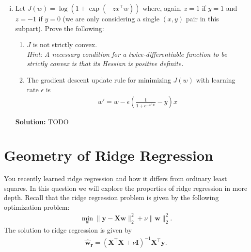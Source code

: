 \documentclass{article}
\newcommand{\mat}[1]{\mathbf{#1}}
\renewcommand{\vec}[1]{\boldsymbol{\mathbf{#1}}}
\newcommand{\Question}[1]{\Large \section{ #1 } \normalsize}
\newenvironment{solution}{\color{blue} \smallskip \textbf{Solution:}}{}
\begin{document}
\begin{enumerate}[(a)]
\begin{enumerate}[(i)]
        \item Let $J(w) = \log(1+\exp(-zx^\top w))$ where, again, $z = 1$ if $y = 1$ and $z = -1$ if $y = 0$ (we are only considering a single $(x, y)$ pair in this subpart). Prove the following:
        \begin{enumerate}
            \item $J$ is not strictly convex. \\
            \emph{Hint: A necessary condition for a twice-differentiable function to be strictly convex is that its Hessian is positive definite.}
            \item The gradient descent update rule for minimizing $J(w)$ with learning rate $\epsilon$ is 
            \begin{align*}
                w' = w - \epsilon\left(\frac{1}{1 + e^{-x^{T}w}} - y\right)x
            \end{align*}
        \end{enumerate}

        \begin{solution}
            TODO
        \end{solution}
    \end{enumerate}
\end{enumerate}

\newpage
\Question{Geometry of Ridge Regression}
You recently learned ridge regression and how it differs from ordinary least squares. In this question we will explore the properties of ridge regression in more depth. Recall that the ridge regression problem is given by the following optimization problem:
\begin{align}
    \min_{w} \|\vec{y} - \mat{X} \vec{w}\|_2^2 + \nu \|\vec{w}\|_2^2. \label{eq:ridge}
\end{align}
The solution to ridge regression is given by
\begin{align}
\vec{\hat{w}_{r}} = (\mat{X}^\top \mat{X} + \nu \mat{I})^{-1} \mat{X}^\top \vec{y}. \label{eq:ridge_sol}
\end{align}
\end{document}
